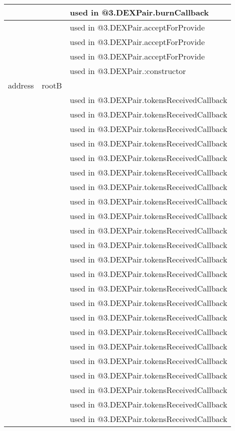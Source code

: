 \begin{tabular}{|l|l|p{5cm}|}
 & & used in @3.DEXPair.burnCallback\\\hline
 & & used in @3.DEXPair.acceptForProvide\\\hline
 & & used in @3.DEXPair.acceptForProvide\\\hline
 & & used in @3.DEXPair.acceptForProvide\\\hline
 & & used in @3.DEXPair.:constructor\\\hline
address & rootB &  \\\hline
 & & used in @3.DEXPair.tokensReceivedCallback\\\hline
 & & used in @3.DEXPair.tokensReceivedCallback\\\hline
 & & used in @3.DEXPair.tokensReceivedCallback\\\hline
 & & used in @3.DEXPair.tokensReceivedCallback\\\hline
 & & used in @3.DEXPair.tokensReceivedCallback\\\hline
 & & used in @3.DEXPair.tokensReceivedCallback\\\hline
 & & used in @3.DEXPair.tokensReceivedCallback\\\hline
 & & used in @3.DEXPair.tokensReceivedCallback\\\hline
 & & used in @3.DEXPair.tokensReceivedCallback\\\hline
 & & used in @3.DEXPair.tokensReceivedCallback\\\hline
 & & used in @3.DEXPair.tokensReceivedCallback\\\hline
 & & used in @3.DEXPair.tokensReceivedCallback\\\hline
 & & used in @3.DEXPair.tokensReceivedCallback\\\hline
 & & used in @3.DEXPair.tokensReceivedCallback\\\hline
 & & used in @3.DEXPair.tokensReceivedCallback\\\hline
 & & used in @3.DEXPair.tokensReceivedCallback\\\hline
 & & used in @3.DEXPair.tokensReceivedCallback\\\hline
 & & used in @3.DEXPair.tokensReceivedCallback\\\hline
 & & used in @3.DEXPair.tokensReceivedCallback\\\hline
 & & used in @3.DEXPair.tokensReceivedCallback\\\hline
 & & used in @3.DEXPair.tokensReceivedCallback\\\hline
 & & used in @3.DEXPair.tokensReceivedCallback\\\hline
 & & used in @3.DEXPair.tokensReceivedCallback\\\hline

\end{tabular}
